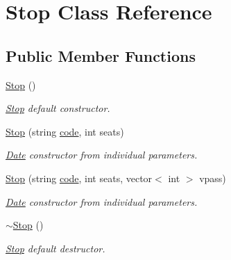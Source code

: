 \hypertarget{class_stop}{}\section{Stop Class Reference}
\label{class_stop}
\subsection*{Public Member Functions}
\begin{DoxyCompactItemize}
\item 
\hyperlink{group___date_gab8870f949c69cda03c4055524ed13c31}{Stop} ()
\begin{DoxyCompactList}\small\item\em \hyperlink{class_stop}{Stop} default constructor. \end{DoxyCompactList}\item 
\hyperlink{group___date_gaa89c250884ae1407ac8647a8a3a58995}{Stop} (string \hyperlink{group___date_ga5a0dddd108225fd437be86eed7b3a3ef}{code}, int seats)
\begin{DoxyCompactList}\small\item\em \hyperlink{class_date}{Date} constructor from individual parameters. \end{DoxyCompactList}\item 
\hyperlink{group___date_ga843a7424de0129e7f6f066d2f8f1d1bc}{Stop} (string \hyperlink{group___date_ga5a0dddd108225fd437be86eed7b3a3ef}{code}, int seats, vector$<$ int $>$ vpass)
\begin{DoxyCompactList}\small\item\em \hyperlink{class_date}{Date} constructor from individual parameters. \end{DoxyCompactList}\item 
\hyperlink{group___date_ga24e85edfa98a7a0212136679b6fad6d2}{$\sim$\+Stop} ()
\begin{DoxyCompactList}\small\item\em \hyperlink{class_stop}{Stop} default destructor. \end{DoxyCompactList}\end{DoxyCompactItemize}
